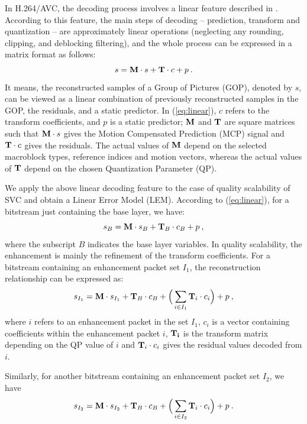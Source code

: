\documentclass[journal,draftclsnofoot,onecolumn]{IEEEtran}
\begin{document}
In H.264/AVC, the decoding process involves a linear feature described in \cite{Winken08}. According to this feature, the main steps of decoding -- prediction, transform and quantization -- are approximately linear operations (neglecting any rounding, clipping, and deblocking filtering), and the whole process can be expressed in a matrix format as follows:
\begin{equation}
\label{eq:linear}
s = {\rm\bf M} \cdot s + {\rm\bf T} \cdot c + p \: .
\end{equation}
It means, the reconstructed samples of a Group of Pictures (GOP), denoted by $s$, can be viewed as a linear combination of previously reconstructed samples in the GOP, the residuals, and a static predictor. In (\ref{eq:linear}), $c$ refers to the transform coefficients, and $p$ is a static predictor; ${\rm\bf M}$ and ${\rm\bf T}$ are square matrices such that ${\rm\bf M} \cdot s$ gives the Motion Compensated Prediction (MCP) signal and ${\rm\bf T} \cdot c$ gives the residuals. The actual values of ${\rm\bf M}$ depend on the selected macroblock types, reference indices and motion vectors, whereas the actual values of ${\rm\bf T}$ depend on the chosen Quantization Parameter (QP).

We apply the above linear decoding feature to the case of quality scalability of SVC and obtain a Linear Error Model (LEM). According to (\ref{eq:linear}), for a bitstream just containing the base layer, we have:
\begin{equation}
\label{eq:base0}
s_{B} = {\rm\bf M} \cdot s_{B} + {\rm\bf T}_{B} \cdot c_{B} + p \: ,
\end{equation}
where the subscript $B$ indicates the base layer variables. In quality scalability, the enhancement is mainly the refinement of the transform coefficients. For a bitstream containing an enhancement packet set $I_1$, the reconstruction relationship can be expressed as:
\begin{equation}
\label{eq:subset1}
s_{I_1} = {\rm\bf M} \cdot s_{I_1} + {\rm\bf T}_{B} \cdot c_{B} + \Big( \sum_{i \in I_1}{\rm\bf T}_i \cdot c_i \Big) + p \: ,
\end{equation}
where $i$ refers to an enhancement packet in the set $I_1$, $c_i$ is a vector containing coefficients within the enhancement packet $i$, ${\rm\bf T_i}$ is the transform matrix depending on the QP value of $i$ and ${\rm\bf T}_i \cdot c_i$ gives the residual values decoded from $i$.

Similarly, for another bitstream containing an enhancement packet set $I_2$, we have
\begin{equation}
\label{eq:subset2}
s_{I_2} = {\rm\bf M} \cdot s_{I_2} + {\rm\bf T}_{B} \cdot c_{B} + \Big( \sum_{i \in I_2}{\rm\bf T}_i \cdot c_i \Big) + p \: .
\end{equation}
\end{document}
